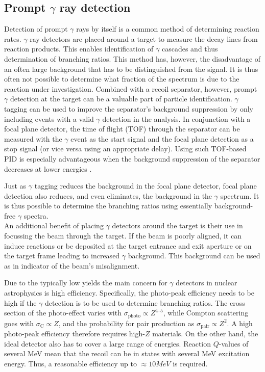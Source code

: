 \subsection{Prompt $\gamma$ ray detection}

Detection of prompt $\gamma$ rays by itself is a common method of determining reaction rates. $\gamma$-ray detectors are placed around a target to measure the decay lines from reaction products. This enables identification of $\gamma$ cascades and thus determination of branching ratios. This method has, however, the disadvantage of an often large background that has to be distinguished from the signal. It is thus often not possible to determine what fraction of the spectrum is due to the reaction under investigation. Combined with a recoil separator, however, prompt $\gamma$ detection at the target can be a valuable part of particle identification. $\gamma$ tagging can be used to improve the separator's background suppression by only including events with a valid $\gamma$ detection in the analysis. In conjunction with a focal plane detector, the time of flight (TOF) through the separator can be measured with the $\gamma$ event as the start signal and the focal plane detection as a stop signal (or vice versa using an appropriate delay). Using such TOF-based PID is especially advantageous when the background suppression of the separator decreases at lower energies \cite{hutc08}. 

Just as $\gamma$ tagging reduces the background in the focal plane detector, focal plane detection also reduces, and even eliminates, the background in the $\gamma$ spectrum. It is thus possible to determine the branching ratios using essentially background-free $\gamma$ spectra.\\
An additional benefit of placing $\gamma$ detectors around the target is their use in focussing the beam through the target. If the beam is poorly aligned, it can induce reactions or be deposited at the target entrance and exit aperture or on the target frame leading to increased $\gamma$ background. This background can be used as in indicator of the beam's misalignment.

Due to the typically low yields the main concern for $\gamma$ detectors in nuclear astrophysics is high efficiency. Specifically, the photo-peak efficiency needs to be high if the $\gamma$ detection is to be used to determine branching ratios. The cross section of the photo-effect varies with $\sigma_\mathrm{photo} \propto Z^{4\textrm{--}5}$, while Compton scattering goes with $\sigma_\mathrm{C} \propto Z$, and the probability for pair production as $\sigma_\mathrm{pair} \propto Z^2$. A high photo-peak efficiency therefore requires high-$Z$ materials. On the other hand, the ideal detector also has to cover a large range of energies. Reaction $Q$-values of several MeV mean that the recoil can be in states with several MeV excitation energy. Thus, a reasonable efficiency up to $\approx 10\unit{MeV}$ is required.

